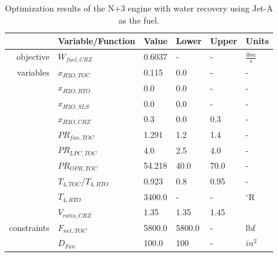 \documentclass[conf]{new-aiaa}
\begin{document}
\begin{table}[h] %
    \centering
    \caption{Optimization results of the N+3 engine with water recovery using Jet-A as the fuel.
    }
    \small
    \renewcommand{\arraystretch}{1.2}
    \begin{tabular}{r l l l l l}
                    & Variable/Function     & Value  & Lower  & Upper & Units           \\
        \toprule
        objective   & $W_{fuel,CRZ}$        & 0.6037 & -      & -     & $\frac{lbm}{s}$ \\
        \hline
        variables   & $x_{H2O,TOC}$         & 0.115  & 0.0    & -     & -               \\
                    & $x_{H2O,RTO}$         & 0.0    & 0.0    & -     & -               \\
                    & $x_{H2O,SLS}$         & 0.0    & 0.0    & -     & -               \\
                    & $x_{H2O,CRZ}$         & 0.3    & 0.0    & 0.3   & -               \\
                    & $PR_{fan,TOC}$        & 1.291  & 1.2    & 1.4   & -               \\
                    & $PR_{LPC,TOC}$        & 4.0    & 2.5    & 4.0   & -               \\
                    & $PR_{OPR,TOC}$        & 54.218 & 40.0   & 70.0  & -               \\
                    & $T_{4,TOC}/T_{4,RTO}$ & 0.923  & 0.8    & 0.95  & -               \\
                    & $T_{4,RTO}$           & 3400.0 & -      & -     & $^\circ$R       \\
                    & $V_{ratio,CRZ}$       & 1.35   & 1.35   & 1.45  &                 \\
        \hline
        constraints & $F_{net,TOC}$         & 5800.0 & 5800.0 & -     & lbf             \\
                    & $D_{Fan}$             & 100.0  & 100    & -     & $in^2$          \\
        \bottomrule
    \end{tabular}
    \label{tab:res_full_opt_JetA}
\end{table}
\end{document}
